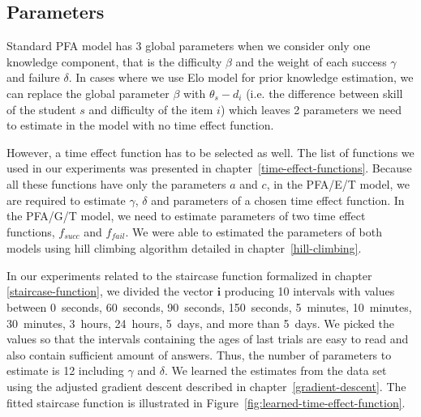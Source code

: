 \subsection{Parameters}
\label{memory-parameters}

Standard PFA model has 3 global parameters when we consider only one knowledge component, that is the difficulty $\beta$ and the weight of each success $\gamma$ and failure $\delta$. In cases where we use Elo model for prior knowledge estimation, we can replace the global parameter $\beta$ with $\theta_s - d_i$ (i.e. the difference between skill of the student $s$ and difficulty of the item $i$) which leaves 2 parameters we need to estimate in the model with no time effect function.

However, a time effect function has to be selected as well. The list of functions we used in our experiments was presented in chapter~\ref{time-effect-functions}. Because all these functions have only the parameters $a$ and $c$, in the PFA/E/T model, we are required to estimate $\gamma$, $\delta$ and parameters of a chosen time effect function. In the PFA/G/T model, we need to estimate parameters of two time effect functions, $f_{\mathit{succ}}$ and $f_{\mathit{fail}}$. We were able to estimated the parameters of both models using hill climbing algorithm detailed in chapter~\ref{hill-climbing}.

In our experiments related to the staircase function formalized in chapter \ref{staircase-function}, we divided the vector $\textbf{i}$ producing 10 intervals with values between 0~seconds, 60~seconds, 90~seconds, 150~seconds, 5~minutes, 10~minutes, 30~minutes, 3~hours, 24~hours, 5~days, and more than 5~days. We picked the values so that the intervals containing the ages of last trials are easy to read and also contain sufficient amount of answers. Thus, the number of parameters to estimate is 12 including $\gamma$ and $\delta$. We learned the estimates from the data set using the adjusted gradient descent described in chapter~\ref{gradient-descent}. The fitted staircase function is illustrated in Figure~\ref{fig:learned-time-effect-function}.


